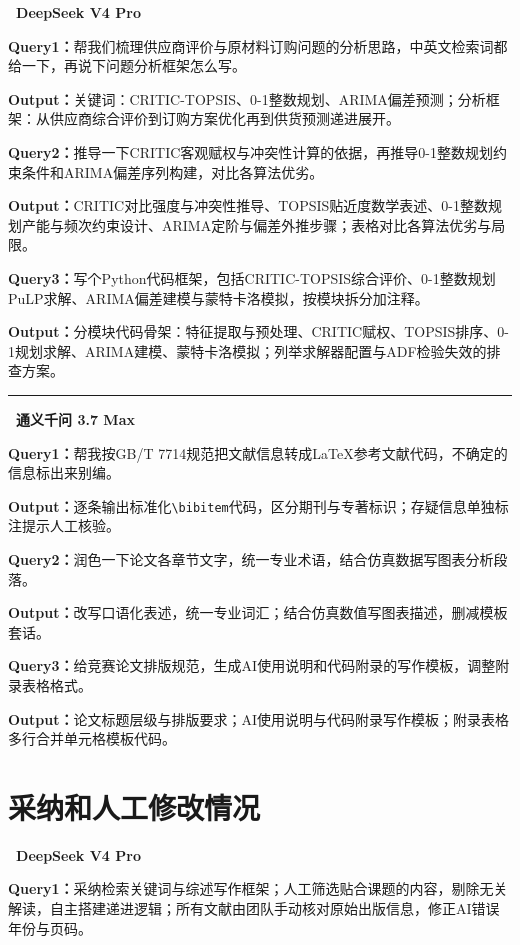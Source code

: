 \documentclass[12pt,a4paper]{ctexart}
\begin{document}
\noindent\textbf{\textbullet~DeepSeek V4 Pro}

\textbf{Query1：}帮我们梳理供应商评价与原材料订购问题的分析思路，中英文检索词都给一下，再说下问题分析框架怎么写。

\textbf{Output：}关键词：CRITIC-TOPSIS、0-1整数规划、ARIMA偏差预测；分析框架：从供应商综合评价到订购方案优化再到供货预测递进展开。

\textbf{Query2：}推导一下CRITIC客观赋权与冲突性计算的依据，再推导0-1整数规划约束条件和ARIMA偏差序列构建，对比各算法优劣。

\textbf{Output：}CRITIC对比强度与冲突性推导、TOPSIS贴近度数学表述、0-1整数规划产能与频次约束设计、ARIMA定阶与偏差外推步骤；表格对比各算法优劣与局限。

\textbf{Query3：}写个Python代码框架，包括CRITIC-TOPSIS综合评价、0-1整数规划PuLP求解、ARIMA偏差建模与蒙特卡洛模拟，按模块拆分加注释。

\textbf{Output：}分模块代码骨架：特征提取与预处理、CRITIC赋权、TOPSIS排序、0-1规划求解、ARIMA建模、蒙特卡洛模拟；列举求解器配置与ADF检验失效的排查方案。

\noindent\rule{\linewidth}{0.4pt}

\noindent\textbf{\textbullet~通义千问 3.7 Max}

\textbf{Query1：}帮我按GB/T 7714规范把文献信息转成LaTeX参考文献代码，不确定的信息标出来别编。

\textbf{Output：}逐条输出标准化\verb|\bibitem|代码，区分期刊与专著标识；存疑信息单独标注提示人工核验。

\textbf{Query2：}润色一下论文各章节文字，统一专业术语，结合仿真数据写图表分析段落。

\textbf{Output：}改写口语化表述，统一专业词汇；结合仿真数值写图表描述，删减模板套话。

\textbf{Query3：}给竞赛论文排版规范，生成AI使用说明和代码附录的写作模板，调整附录表格格式。

\textbf{Output：}论文标题层级与排版要求；AI使用说明与代码附录写作模板；附录表格多行合并单元格模板代码。

\section{采纳和人工修改情况}

\noindent\textbf{\textbullet~DeepSeek V4 Pro}

\textbf{Query1：}采纳检索关键词与综述写作框架；人工筛选贴合课题的内容，剔除无关解读，自主搭建递进逻辑；所有文献由团队手动核对原始出版信息，修正AI错误年份与页码。
\end{document}
